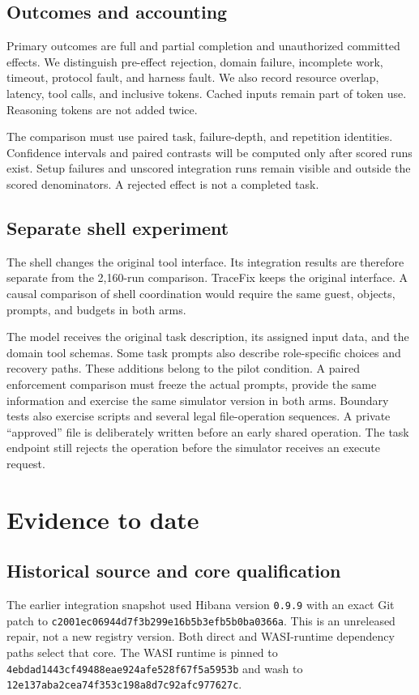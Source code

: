 \documentclass[10pt]{article}
\begin{document}
\subsection{Outcomes and accounting}
Primary outcomes are full and partial completion and unauthorized committed
effects. We distinguish pre-effect rejection, domain failure, incomplete work,
timeout, protocol fault, and harness fault. We also record resource overlap,
latency, tool calls, and inclusive tokens. Cached inputs remain part of token
use. Reasoning tokens are not added twice.

The comparison must use paired task, failure-depth, and repetition identities.
Confidence intervals and paired contrasts will be computed only after scored
runs exist. Setup failures and unscored integration runs remain visible and
outside the scored denominators. A rejected effect is not a completed task.

\subsection{Separate shell experiment}
The shell changes the original tool interface. Its integration results are
therefore separate from the 2,160-run comparison. TraceFix keeps the original
interface. A causal comparison of shell coordination would require the same
guest, objects, prompts, and budgets in both arms.

The model receives the original task description, its assigned input data, and
the domain tool schemas. Some task prompts also describe role-specific choices
and recovery paths. These additions belong to the pilot condition. A paired
enforcement comparison must freeze the actual prompts, provide the same
information and exercise the same simulator version in both arms. Boundary tests
also exercise scripts and several legal file-operation sequences. A private
``approved'' file is deliberately written before an early shared operation.
The task endpoint still rejects the operation before the simulator receives
an execute request.

\section{Evidence to date}
\subsection{Historical source and core qualification}
The earlier integration snapshot used Hibana version \texttt{0.9.9} with an exact Git
patch to \texttt{c2001ec06944d7f3b299e16b5b3efb5b0ba0366a}. This is an unreleased
repair, not a new registry version. Both direct and WASI-runtime dependency
paths select that core. The WASI runtime is pinned to
\texttt{4ebdad1443cf49488eae924afe528f67f5a5953b} and wash to
\texttt{12e137aba2cea74f353c198a8d7c92afc977627c}.
\end{document}
